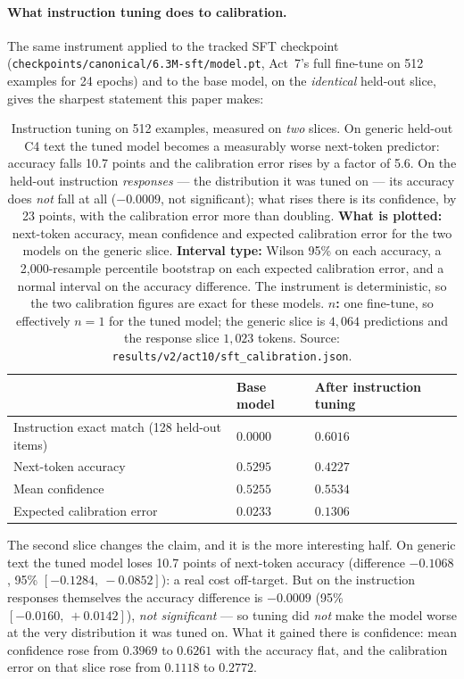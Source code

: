 \documentclass[11pt,a4paper]{article}
\begin{document}
\paragraph{What instruction tuning does to calibration.} The same instrument
applied to the tracked SFT checkpoint
(\texttt{checkpoints/canonical/6.3M-sft/model.pt}, Act~7's full fine-tune on
512 examples for 24 epochs) and to the base model, on the \emph{identical}
held-out slice, gives the sharpest statement this paper makes:

\begin{table}[H]
\centering
\begin{tabular}{L{4.6cm}R{3.0cm}R{3.0cm}}
\toprule
& Base model & After instruction tuning \\
\midrule
Instruction exact match (128 held-out items) & $0.0000$ & $0.6016$ \\
Next-token accuracy & $0.5295$ & $0.4227$ \\
Mean confidence & $0.5255$ & $0.5534$ \\
Expected calibration error & $\mathbf{0.0233}$ & $\mathbf{0.1306}$ \\
\bottomrule
\end{tabular}
\caption{Instruction tuning on 512 examples, measured on \emph{two} slices.
On generic held-out C4 text the tuned model becomes a measurably worse
next-token predictor: accuracy falls 10.7 points and the calibration error
rises by a factor of 5.6. On the held-out instruction \emph{responses} --- the
distribution it was tuned on --- its accuracy does \emph{not} fall at all
($-0.0009$, not significant); what rises there is its confidence, by 23
points, with the calibration error more than doubling. \textbf{What is
plotted:} next-token accuracy, mean confidence and expected calibration error
for the two models on the generic slice. \textbf{Interval type:} Wilson 95\%
on each accuracy, a 2{,}000-resample percentile bootstrap on each expected
calibration error, and a normal interval on the accuracy difference. The
instrument is deterministic, so the two calibration figures are exact for these
models. \textbf{$n$:} one fine-tune, so effectively $n = 1$ for the tuned
model; the generic slice is $4{,}064$ predictions and the response slice
$1{,}023$ tokens. Source:
\texttt{results/v2/act10/sft\_calibration.json}.} \label{tab:act10c-sft}
\end{table}

The second slice changes the claim, and it is the more interesting half. On
generic text the tuned model loses 10.7 points of next-token accuracy
(difference $-0.1068$, 95\% $[-0.1284,\ -0.0852]$): a real cost off-target.
But on the instruction responses themselves the accuracy difference is
$-0.0009$ (95\% $[-0.0160,\ +0.0142]$), \emph{not significant} --- so tuning
did \emph{not} make the model worse at the very distribution it was tuned on.
What it gained there is confidence: mean confidence rose from $0.3969$ to
$0.6261$ with the accuracy flat, and the calibration error on that slice rose
from $0.1118$ to $0.2772$.
\end{document}
